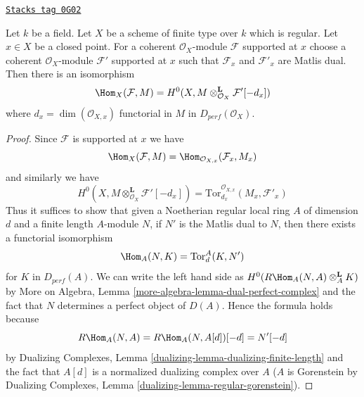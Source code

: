 \begin{lemma}
\label{equiv-lemma-duality-at-point}
\href{https://stacks.math.columbia.edu/tag/0G02}{\texttt{Stacks tag 0G02}}

Let $k$ be a field. Let $X$ be a scheme of finite type over $k$ which
is regular. Let $x \in X$ be a closed point. For a coherent
$\mathcal{O}_X$-module $\mathcal{F}$ supported at $x$ choose
a coherent $\mathcal{O}_X$-module $\mathcal{F}'$ supported at $x$
such that $\mathcal{F}_x$ and $\mathcal{F}'_x$ are Matlis dual.
Then there is an isomorphism
$$
\Hom_X(\mathcal{F}, M) =
H^0(X, M \otimes_{\mathcal{O}_X}^\mathbf{L} \mathcal{F}'[-d_x])
$$
where $d_x = \dim(\mathcal{O}_{X, x})$
functorial in $M$ in $D_{perf}(\mathcal{O}_X)$.
\end{lemma}

\begin{proof}
Since $\mathcal{F}$ is supported at $x$ we have
$$
\Hom_X(\mathcal{F}, M) =
\Hom_{\mathcal{O}_{X, x}}(\mathcal{F}_x, M_x)
$$
and similarly we have
$$
H^0(X, M \otimes_{\mathcal{O}_X}^\mathbf{L} \mathcal{F}'[-d_x]) =
\text{Tor}^{\mathcal{O}_{X, x}}_{d_x}(M_x, \mathcal{F}'_x)
$$
Thus it suffices to show that given a Noetherian regular local ring $A$
of dimension $d$ and a finite length $A$-module $N$, if
$N'$ is the Matlis dual to $N$, then there exists a functorial isomorphism
$$
\Hom_A(N, K) = \text{Tor}^A_d(K, N')
$$
for $K$ in $D_{perf}(A)$. We can write the left hand side as
$H^0(R\Hom_A(N, A) \otimes_A^\mathbf{L} K)$ by
More on Algebra, Lemma \ref{more-algebra-lemma-dual-perfect-complex}
and the fact that $N$ determines a perfect object of $D(A)$.
Hence the formula holds because
$$
R\Hom_A(N, A) = R\Hom_A(N, A[d])[-d] = N'[-d]
$$
by Dualizing Complexes, Lemma \ref{dualizing-lemma-dualizing-finite-length}
and the fact that $A[d]$ is a normalized dualizing complex over $A$
($A$ is Gorenstein by
Dualizing Complexes, Lemma \ref{dualizing-lemma-regular-gorenstein}).
\end{proof}


